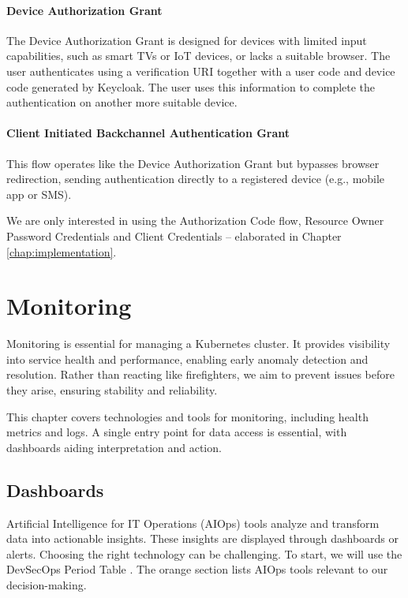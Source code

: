 \paragraph{Device Authorization Grant} The Device Authorization Grant is designed for devices with limited input capabilities, such as smart TVs or IoT devices, or lacks a suitable browser. The user authenticates using a verification URI together with a user code and device code generated by Keycloak. The user uses this information to complete the authentication on another more suitable device.

\paragraph{Client Initiated Backchannel Authentication Grant} This flow operates like the Device Authorization Grant but bypasses browser redirection, sending authentication directly to a registered device (e.g., mobile app or SMS).

We are only interested in using the Authorization Code flow, Resource Owner Password Credentials and Client Credentials -- elaborated in Chapter \ref{chap:implementation}.

\section{Monitoring}

Monitoring is essential for managing a Kubernetes cluster. It provides visibility into service health and performance, enabling early anomaly detection and resolution. Rather than reacting like firefighters, we aim to prevent issues before they arise, ensuring stability and reliability.

This chapter covers technologies and tools for monitoring, including health metrics and logs. A single entry point for data access is essential, with dashboards aiding interpretation and action.

\subsection{Dashboards}
Artificial Intelligence for IT Operations (AIOps) tools analyze and transform data into actionable insights. These insights are displayed through dashboards or alerts. Choosing the right technology can be challenging. To start, we will use the DevSecOps Period Table \parencite{digitalai2025devsecops}. The orange section lists AIOps tools relevant to our decision-making.

